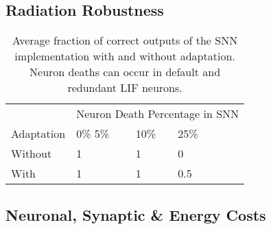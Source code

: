 
\subsection*{Radiation Robustness}\label{subsec:algorithm_performance}

\begin{table}[H]
\caption{Average fraction of correct outputs of the SNN implementation with and without adaptation. Neuron deaths can occur in default and redundant LIF neurons.}
\begin{tabular}{llllll}
        & \multicolumn{5}{l}{Neuron Death Percentage in SNN} \\ \cmidrule{2-6}
        Adaptation & 0\%   5\% & 10\%    & 25\%     \\ \hline
        Without      & 1 &  1    & 0                 \\
        With      & 1 & 1    & 0.5                   \\    
\end{tabular}
\end{table}


\subsection*{Neuronal, Synaptic \& Energy Costs}\label{subsec:results_neuronal_synaptic_overcapacity}

